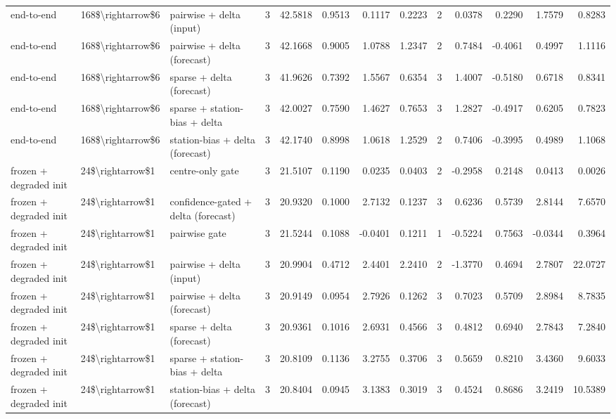 \begin{table}
\begin{tabular}{lllrrrrrrrrrr}
end-to-end & 168\$\textbackslash rightarrow\$6 & pairwise + delta (input) & 3 & 42.5818 & 0.9513 & 0.1117 & 0.2223 & 2 & 0.0378 & 0.2290 & 1.7579 & 0.8283 \\
end-to-end & 168\$\textbackslash rightarrow\$6 & pairwise + delta (forecast) & 3 & 42.1668 & 0.9005 & 1.0788 & 1.2347 & 2 & 0.7484 & -0.4061 & 0.4997 & 1.1116 \\
end-to-end & 168\$\textbackslash rightarrow\$6 & sparse + delta (forecast) & 3 & 41.9626 & 0.7392 & 1.5567 & 0.6354 & 3 & 1.4007 & -0.5180 & 0.6718 & 0.8341 \\
end-to-end & 168\$\textbackslash rightarrow\$6 & sparse + station-bias + delta & 3 & 42.0027 & 0.7590 & 1.4627 & 0.7653 & 3 & 1.2827 & -0.4917 & 0.6205 & 0.7823 \\
end-to-end & 168\$\textbackslash rightarrow\$6 & station-bias + delta (forecast) & 3 & 42.1740 & 0.8998 & 1.0618 & 1.2529 & 2 & 0.7406 & -0.3995 & 0.4989 & 1.1068 \\
frozen + degraded init & 24\$\textbackslash rightarrow\$1 & centre-only gate & 3 & 21.5107 & 0.1190 & 0.0235 & 0.0403 & 2 & -0.2958 & 0.2148 & 0.0413 & 0.0026 \\
frozen + degraded init & 24\$\textbackslash rightarrow\$1 & confidence-gated + delta (forecast) & 3 & 20.9320 & 0.1000 & 2.7132 & 0.1237 & 3 & 0.6236 & 0.5739 & 2.8144 & 7.6570 \\
frozen + degraded init & 24\$\textbackslash rightarrow\$1 & pairwise gate & 3 & 21.5244 & 0.1088 & -0.0401 & 0.1211 & 1 & -0.5224 & 0.7563 & -0.0344 & 0.3964 \\
frozen + degraded init & 24\$\textbackslash rightarrow\$1 & pairwise + delta (input) & 3 & 20.9904 & 0.4712 & 2.4401 & 2.2410 & 2 & -1.3770 & 0.4694 & 2.7807 & 22.0727 \\
frozen + degraded init & 24\$\textbackslash rightarrow\$1 & pairwise + delta (forecast) & 3 & 20.9149 & 0.0954 & 2.7926 & 0.1262 & 3 & 0.7023 & 0.5709 & 2.8984 & 8.7835 \\
frozen + degraded init & 24\$\textbackslash rightarrow\$1 & sparse + delta (forecast) & 3 & 20.9361 & 0.1016 & 2.6931 & 0.4566 & 3 & 0.4812 & 0.6940 & 2.7843 & 7.2840 \\
frozen + degraded init & 24\$\textbackslash rightarrow\$1 & sparse + station-bias + delta & 3 & 20.8109 & 0.1136 & 3.2755 & 0.3706 & 3 & 0.5659 & 0.8210 & 3.4360 & 9.6033 \\
frozen + degraded init & 24\$\textbackslash rightarrow\$1 & station-bias + delta (forecast) & 3 & 20.8404 & 0.0945 & 3.1383 & 0.3019 & 3 & 0.4524 & 0.8686 & 3.2419 & 10.5389 \\

\end{tabular}
\end{table}
